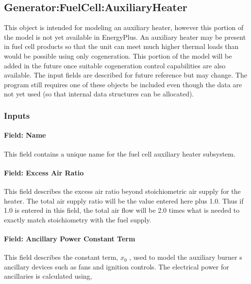 \subsection{Generator:FuelCell:AuxiliaryHeater}\label{generatorfuelcellauxiliaryheater}

This object is intended for modeling an auxiliary heater, however this portion of the model is not yet available in EnergyPlus. An auxiliary heater may be present in fuel cell products so that the unit can meet much higher thermal loads than would be possible using only cogeneration. This portion of the model will be added in the future once suitable cogeneration control capabilities are also available. The input fields are described for future reference but may change. The program still requires one of these objects be included even though the data are not yet used (so that internal data structures can be allocated).

\subsubsection{Inputs}\label{inputs-16-002}

\paragraph{Field: Name}\label{field-name-18-000}

This field contains a unique name for the fuel cell auxiliary heater subsystem.

\paragraph{Field: Excess Air Ratio}\label{field-excess-air-ratio}

This field describes the excess air ratio beyond stoichiometric air supply for the heater. The total air supply ratio will be the value entered here plus 1.0. Thus if 1.0 is entered in this field, the total air flow will be 2.0 times what is needed to exactly match stoichiometry with the fuel supply.

\paragraph{Field: Ancillary Power Constant Term}\label{field-ancillary-power-constant-term}

This field describes the constant term, \({x_0}\) , used to model the auxiliary burner s ancillary devices such as fans and ignition controls. The electrical power for ancillaries is calculated using,

